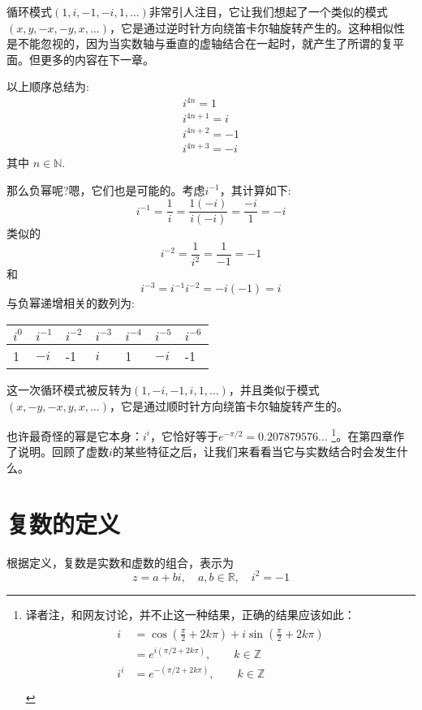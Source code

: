 循环模式$(1,i,-1,-i, 1, \ldots)$非常引人注目，它让我们想起了一个类似的模式$(x, y,-x,-y, x, \ldots)$，它是通过逆时针方向绕笛卡尔轴旋转产生的。这种相似性是不能忽视的，因为当实数轴与垂直的虚轴结合在一起时，就产生了所谓的复平面。但更多的内容在下一章。

以上顺序总结为:
$$
  \begin{gathered}
    i^{4 n}=1 \\
    i^{4 n+1}=i \\
    i^{4 n+2}=-1 \\
    i^{4 n+3}=-i
  \end{gathered}
$$
其中 $n \in \mathbb{N}$.

那么负幂呢?嗯，它们也是可能的。考虑$i^{-1}$，其计算如下:
$$
  i^{-1}=\frac{1}{i}=\frac{1(-i)}{i(-i)}=\frac{-i}{1}=-i
$$
类似的
$$
  i^{-2}=\frac{1}{i^{2}}=\frac{1}{-1}=-1
$$
和
$$
  i^{-3}=i^{-1} i^{-2}=-i(-1)=i
$$
与负幂递增相关的数列为:
\begin{center}
  \begin{tabular}{lllllll}
    \hline
    $i^{0}$ & $i^{-1}$ & $i^{-2}$ & $i^{-3}$ & $i^{-4}$ & $i^{-5}$ & $i^{-6}$ \\
    \hline
    1       & $-i$     & -1       & $i$      & 1        & $-i$     & -1       \\
    \hline
  \end{tabular}
\end{center}

这一次循环模式被反转为$(1,-i,-1, i, 1, \ldots)$，并且类似于模式$(x,-y,-x, y, x, \ldots)$，它是通过顺时针方向绕笛卡尔轴旋转产生的。

也许最奇怪的幂是它本身：$i^{i}$，它恰好等于$e^{-\pi / 2}= 0.207879576\dots$ \footnote{译者注，和网友讨论，并不止这一种结果，正确的结果应该如此：
  \begin{align*}
    \begin{aligned}
      i   & =  \cos (\frac{\pi}{2}+2k\pi)+i\sin(\frac{\pi}{2}+2k\pi) \\
          & =e^{i({\pi/2}+2k\pi)},\qquad k\in \mathbb{Z}             \\
      i^i & = e^{-(\pi/2+2k\pi)},\qquad k\in \mathbb{Z}              \\
    \end{aligned}
  \end{align*}
}。在第四章作了说明。回顾了虚数$i$的某些特征之后，让我们来看看当它与实数结合时会发生什么。

\section{复数的定义}
根据定义，复数是实数和虚数的组合，表示为
$$
  z=a+b i, \quad a, b \in \mathbb{R}, \quad i^{2}=-1
$$

